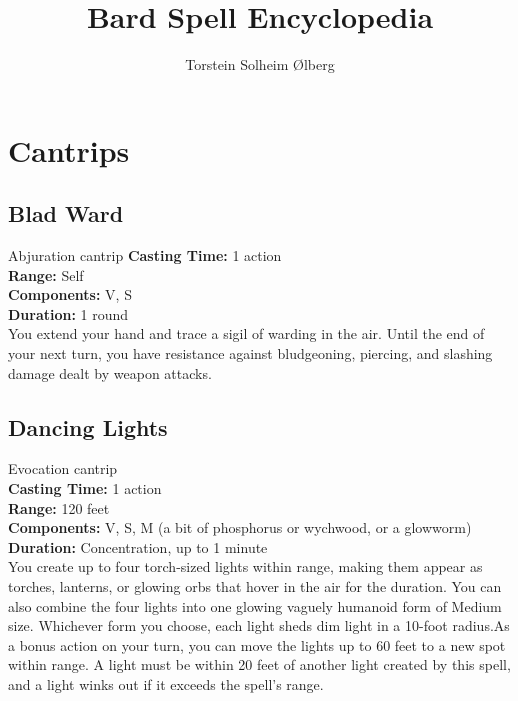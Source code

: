 \documentclass[11pt, A4paper, english]{article}
\author{Torstein Solheim Ølberg}
\title{Bard Spell Encyclopedia}
\begin{document}
\maketitle

\tableofcontents

	\section{Cantrips}
		\subsection{Blad Ward}
Abjuration cantrip
\textbf{Casting Time:} 1 action \\
\textbf{Range:} Self \\
\textbf{Components:} V, S \\
\textbf{Duration:} 1 round \\
You extend your hand and trace a sigil of warding in the air. Until the end of your next turn, you have resistance against bludgeoning, piercing, and slashing damage dealt by weapon attacks.

		\subsection{Dancing Lights}
Evocation cantrip \\
\textbf{Casting Time:} 1 action \\
\textbf{Range:} 120 feet \\
\textbf{Components:} V, S, M (a bit of phosphorus or wychwood, or a glowworm) \\
\textbf{Duration:} Concentration, up to  1  minute \\
You create up to four torch-sized lights within range, making them appear as torches, lanterns, or glowing orbs that hover in the air for the duration. You can also combine the four lights into one glowing vaguely humanoid form of Medium size. Whichever form you choose, each light sheds dim light in a  10-foot radius.As a bonus action on your turn, you can move the lights up to 60 feet to a new spot within range. A light must be within 20 feet of another light created by this spell, and a light winks out if it exceeds the spell’s range.
\end{document}
